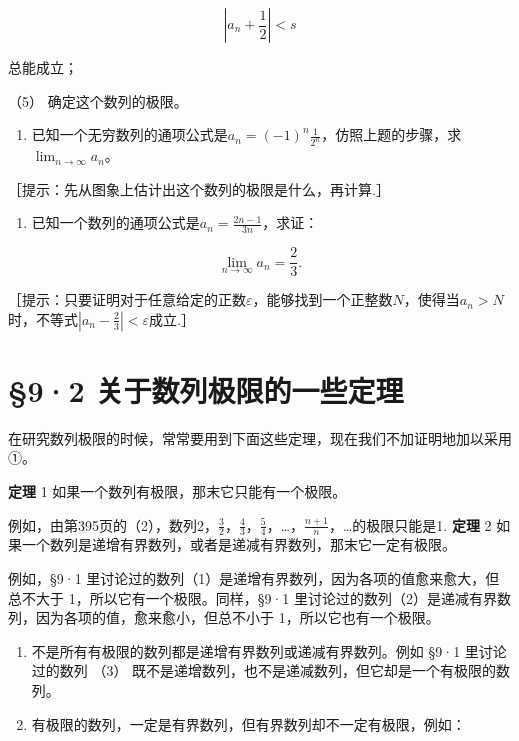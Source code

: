 \[
\left| a_{n} + \frac{1}{2} \right| < s
\]

总能成立；

（5） 确定这个数列的极限。

\begin{enumerate}[start=2]
\item
  已知一个无穷数列的通项公式是\(a_{n} = (-1)^{n} \frac{1}{2^{n}}\)，仿照上题的步骤，求\(\lim_{n \to \infty} a_{n}\)。
\end{enumerate}

［提示：先从图象上估计出这个数列的极限是什么，再计算.］

\begin{enumerate}[start=8]
\item
  已知一个数列的通项公式是\(a_{n} = \frac{2n - 1}{3n}\)，求证：
\end{enumerate}

\[
\lim_{n \rightarrow \infty} a_{n} = \frac{2}{3}.
\]

［提示：只要证明对于任意给定的正数\(\varepsilon\)，能够找到一个正整数\(N\)，使得当\(a_{n} > N\)时，不等式\(\left|a_{n} - \frac{2}{3}\right| < \varepsilon\)成立.］

\section{§9·2 关于数列极限的一些定理}

在研究数列极限的时候，常常要用到下面这些定理，现在我们不加证明地加以采用①。

\textbf{定理} 1 如果一个数列有极限，那末它只能有一个极限。

例如，由第395页的（2），数列2，\(\frac{3}{2}\)，\(\frac{4}{3}\)，\(\frac{5}{4}\)，\ldots，\(\frac{n+1}{n}\)，\ldots 的极限只能是1.
\textbf{定理} 2
如果一个数列是递增有界数列，或者是递减有界数列，那末它一定有极限。

例如，§9·1
里讨论过的数列（1）是递增有界数列，因为各项的值愈来愈大，但总不大于
1，所以它有一个极限。同样，§9·1
里讨论过的数列（2）是递减有界数列，因为各项的值，愈来愈小，但总不小于
1，所以它也有一个极限。


\begin{enumerate}
\item
  不是所有有极限的数列都是递增有界数列或递减有界数列。例如 §9·1
  里讨论过的数列 （3）
  既不是递增数列，也不是递减数列，但它却是一个有极限的数列。
\item
  有极限的数列，一定是有界数列，但有界数列却不一定有极限，例如：
\end{enumerate}

